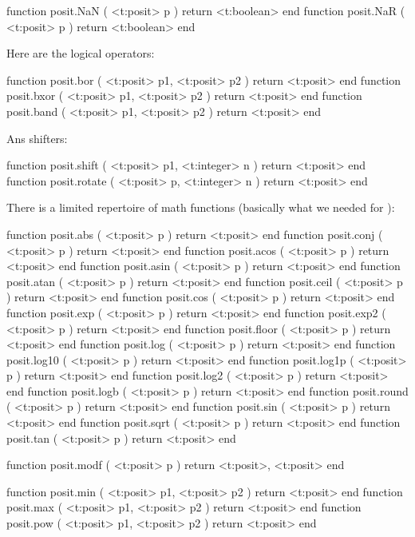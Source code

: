 \starttyping[option=LUA]
function posit.NaN ( <t:posit> p ) return <t:boolean> end
function posit.NaR ( <t:posit> p ) return <t:boolean> end
\stoptyping

Here are the logical operators:

\starttyping[option=LUA]
function posit.bor  ( <t:posit> p1, <t:posit> p2 ) return <t:posit> end
function posit.bxor ( <t:posit> p1, <t:posit> p2 ) return <t:posit> end
function posit.band ( <t:posit> p1, <t:posit> p2 ) return <t:posit> end
\stoptyping

Ans shifters:

\starttyping[option=LUA]
function posit.shift  ( <t:posit> p1, <t:integer> n ) return <t:posit> end
function posit.rotate ( <t:posit> p,  <t:integer> n ) return <t:posit> end
\stoptyping

There is a limited repertoire of math functions (basically what we needed for
\METAPOST):

\starttyping[option=LUA]
function posit.abs   ( <t:posit> p ) return <t:posit> end
function posit.conj  ( <t:posit> p ) return <t:posit> end
function posit.acos  ( <t:posit> p ) return <t:posit> end
function posit.asin  ( <t:posit> p ) return <t:posit> end
function posit.atan  ( <t:posit> p ) return <t:posit> end
function posit.ceil  ( <t:posit> p ) return <t:posit> end
function posit.cos   ( <t:posit> p ) return <t:posit> end
function posit.exp   ( <t:posit> p ) return <t:posit> end
function posit.exp2  ( <t:posit> p ) return <t:posit> end
function posit.floor ( <t:posit> p ) return <t:posit> end
function posit.log   ( <t:posit> p ) return <t:posit> end
function posit.log10 ( <t:posit> p ) return <t:posit> end
function posit.log1p ( <t:posit> p ) return <t:posit> end
function posit.log2  ( <t:posit> p ) return <t:posit> end
function posit.logb  ( <t:posit> p ) return <t:posit> end
function posit.round ( <t:posit> p ) return <t:posit> end
function posit.sin   ( <t:posit> p ) return <t:posit> end
function posit.sqrt  ( <t:posit> p ) return <t:posit> end
function posit.tan   ( <t:posit> p ) return <t:posit> end

function posit.modf ( <t:posit> p )
    return
        <t:posit>,
        <t:posit>
end

function posit.min ( <t:posit> p1, <t:posit> p2 ) return <t:posit> end
function posit.max ( <t:posit> p1, <t:posit> p2 ) return <t:posit> end
function posit.pow ( <t:posit> p1, <t:posit> p2 ) return <t:posit> end
\stoptyping


